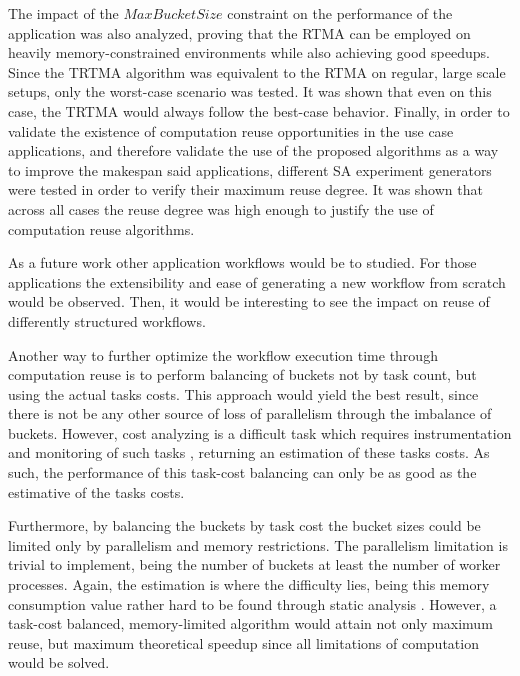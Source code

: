The impact of the $MaxBucketSize$ constraint on the performance of the application was also analyzed, proving that the RTMA can be employed on heavily memory-constrained environments while also achieving good speedups. Since the TRTMA algorithm was equivalent to the RTMA on regular, large scale setups, only the worst-case scenario was tested. It was shown that even on this case, the TRTMA would always follow the best-case behavior. Finally, in order to validate the existence of computation reuse opportunities in the use case applications, and therefore validate the use of the proposed algorithms as a way to improve the makespan said applications, different SA experiment generators were tested in order to verify their maximum reuse degree. It was shown that across all cases the reuse degree was high enough to justify the use of computation reuse algorithms.

As a future work other application workflows would be to studied. For those applications the extensibility and ease of generating a new workflow from scratch would be observed. Then, it would be interesting to see the impact on reuse of differently structured workflows.

Another way to further optimize the workflow execution time through computation reuse is to perform balancing of buckets not by task count, but using the actual tasks costs. This approach would yield the best result, since there is not be any other source of loss of parallelism through the imbalance of buckets. However, cost analyzing is a difficult task which requires instrumentation and monitoring of such tasks \cite{instr1, instr2, instr3}, returning an estimation of these tasks costs. As such, the performance of this task-cost balancing can only be as good as the estimative of the tasks costs.

Furthermore, by balancing the buckets by task cost the bucket sizes could be limited only by parallelism and memory restrictions. The parallelism limitation is trivial to implement, being the number of buckets at least the number of worker processes. Again, the estimation is where the difficulty lies, being this memory consumption value rather hard to be found through static analysis \cite{mem_cost}. However, a task-cost balanced, memory-limited algorithm would attain not only maximum reuse, but maximum theoretical speedup since all limitations of computation would be solved.
